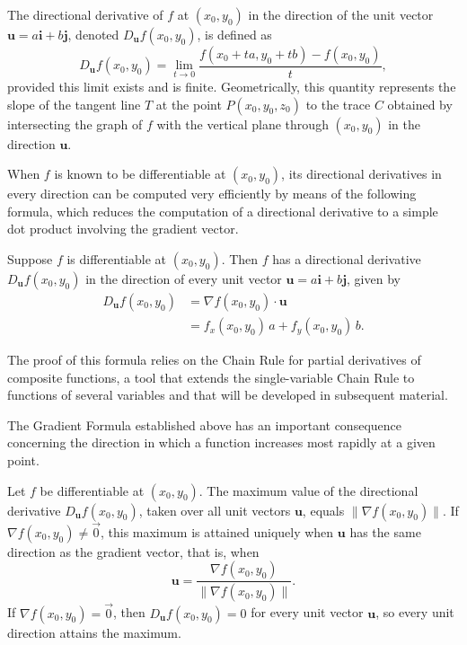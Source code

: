 \begin{definition}
The directional derivative of $f$ at $(x_0,y_0)$ in the direction of the unit vector $\mathbf{u} = a\mathbf{i}+b\mathbf{j}$, denoted $D_{\mathbf{u}} f(x_0,y_0)$, is defined as \[
D_{\mathbf{u}} f(x_0,y_0) = \lim_{t \to 0} \frac{f(x_0+ta, y_0+tb) - f(x_0,y_0)}{t},
\] provided this limit exists and is finite. Geometrically, this quantity represents the slope of the tangent line $T$ at the point $P(x_0,y_0,z_0)$ to the trace $C$ obtained by intersecting the graph of $f$ with the vertical plane through $(x_0,y_0)$ in the direction $\mathbf{u}$.
\end{definition}

When $f$ is known to be differentiable at $(x_0,y_0)$, its directional derivatives in every direction can be computed very efficiently by means of the following formula, which reduces the computation of a directional derivative to a simple dot product involving the gradient vector.

\begin{theorem}
Suppose $f$ is differentiable at $(x_0,y_0)$. Then $f$ has a directional derivative $D_{\mathbf{u}} f(x_0,y_0)$ in the direction of every unit vector $\mathbf{u} = a\mathbf{i}+b\mathbf{j}$, given by
\[
\begin{aligned}
D_{\mathbf{u}} f(x_0,y_0) &= \nabla f(x_0,y_0) \cdot \mathbf{u} \\[0.5em]
&= f_x(x_0,y_0) \, a + f_y(x_0,y_0) \, b.
\end{aligned}
\]

\end{theorem}

The proof of this formula relies on the Chain Rule for partial derivatives of composite functions, a tool that extends the single-variable Chain Rule to functions of several variables and that will be developed in subsequent material.

The Gradient Formula established above has an important consequence concerning the direction in which a function increases most rapidly at a given point.

\begin{theorem}
Let $f$ be differentiable at $(x_0,y_0)$. The maximum value of the directional derivative $D_{\mathbf{u}} f(x_0,y_0)$, taken over all unit vectors $\mathbf{u}$, equals $\| \nabla f(x_0,y_0) \|$. If $\nabla f(x_0,y_0) \neq \vec{0}$, this maximum is attained uniquely when $\mathbf{u}$ has the same direction as the gradient vector, that is, when
\[
\mathbf{u} = \frac{\nabla f(x_0,y_0)}{\| \nabla f(x_0,y_0) \|}.
\]
If $\nabla f(x_0,y_0)=\vec{0}$, then $D_{\mathbf{u}}f(x_0,y_0)=0$ for every unit vector $\mathbf{u}$, so every unit direction attains the maximum.

\end{theorem}

